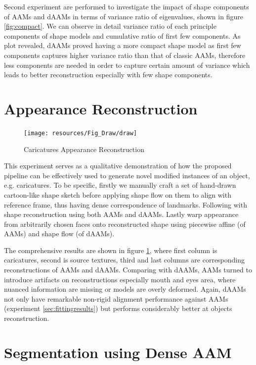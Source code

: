 Second experiment are performed to investigate the impact of shape components of AAMs and dAAMs in terms of variance ratio of eigenvalues, shown in figure \ref{fig:compact}. We can observe in detail variance ratio of each principle components of shape models and cumulative ratio of first few components. As plot revealed, dAAMs proved having a more compact shape model as first few components captures higher variance ratio than that of classic AAMs, therefore less components are needed in order to capture certain amount of variance which leads to better reconstruction especially with few shape components.


\section{Appearance Reconstruction}
\label{sec:reconstruct}

\begin{figure}[h]
    \centering
    \texttt{[image: resources/Fig\_Draw/draw]}
    \caption{Caricatures Appearance Reconstruction}
    \label{fig:draw}
\end{figure}

This experiment serves as a qualitative demonstration of how the proposed pipeline can be effectively used to generate novel modified instances of an object, e.g. caricatures. To be specific, firstly we manually craft a set of hand-drawn cartoon-like shape sketch before applying shape flow on them to align with reference frame, thus having dense correspondence of landmarks. Following with shape reconstruction using both AAMs and dAAMs. Lastly warp appearance from arbitrarily chosen faces onto reconstructed shape using piecewise affine (of AAMs) and shape flow (of dAAMs). 

The comprehensive results are shown in figure \ref{fig:draw}, where first column is caricatures, second is source textures, third and last columns are corresponding reconstructions of AAMs and dAAMs. Comparing with dAAMs, AAMs turned to introduce artifacts on reconstructions especially mouth and eyes area, where nuanced information are missing or models are overly deformed. Again, dAAMs not only have remarkable non-rigid alignment performance against AAMs (experiment \ref{sec:fittingresults}) but performs considerably better at objects reconstruction.

\section{Segmentation using Dense AAM}
\label{sec:segmentation}

